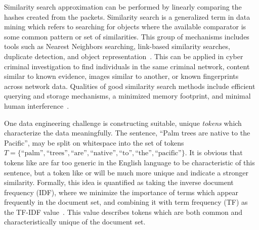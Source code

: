 Similarity search approximation can be performed by linearly comparing the hashes created from the packets. Similarity search is a generalized term in data mining which refers to searching for objects where the available comparator is some common pattern or set of similarities. This group of mechanisms includes tools such as Nearest Neighbors searching, link-based similarity searches, duplicate detection, and object representation~\cite{lshforest}. This can be applied in cyber criminal investigation to find individuals in the same criminal network, content similar to known evidence, images similar to another, or known fingerprints across network data. Qualities of good similarity search methods include efficient querying and storage mechanisms, a minimized memory footprint, and minimal human interference~\cite{simsearch}.

One data engineering challenge is constructing suitable, unique \textit{tokens} which characterize the data meaningfully. The sentence, ``Palm trees are native to the Pacific'', may be split on whitespace into the set of tokens $T = \{\text{``palm''}, \text{``trees''}, \text{``are''}, \text{``native''}, \text{``to''}, \text{``the''}, \text{``pacific''}\}$. It is obvious that tokens like  are far too generic in the English language to be characteristic of this sentence, but a token like  or  will be much more unique and indicate a stronger similarity. Formally, this idea is quantified as taking the inverse document frequency (IDF), where we minimize the importance of terms which appear frequently in the document set, and combining it with term frequency (TF) as the TF-IDF value~\cite{tf-idf}. This value describes tokens which are both common and characteristically unique of the document set.
